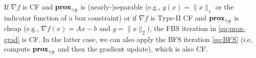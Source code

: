 {\begin{example}
If $\nabla f$ is CF and $\mathbf{prox}_{\gamma g}$ is (nearly-)separable (e.g., $g(x)=\|x\|_1$ or the indicator function of a box constraint) or if $\nabla f$ is Type-II CF and $\mathbf{prox}_{\gamma g}$ is cheap (e.g., $\nabla f(x)=Ax-b$ and $g=\|x\|_2$), the FBS iteration in \eqref{eq:prox-grad} is CF. In the latter case, we can also apply the BFS iteration \eqref{eq:BFS} (i.e,  compute $\mathbf{prox}_ {\gamma g}$ and then the gradient update), which is also CF.

\end{example}


}
